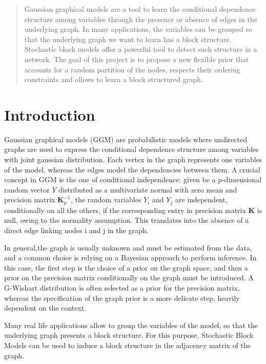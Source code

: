 


\begin{abstract} %
Gaussian graphical models are a tool to learn the conditional dependence structure among variables through the presence or absence of edges in the underlying graph. In many applications, the variables can be grouped so that the underlying graph we want to learn has a block structure. Stochastic block models offer a powerful tool to detect such structure in a network. The goal of this project is to propose a new flexible prior that accounts for a random partition of the nodes, respects their ordering constraints and allows to learn a block structured graph.
\end{abstract}


\section{Introduction}

Gaussian graphical models (GGM) are probabilistic models where undirected graphs are used to express the conditional dependence structure among variables with joint gaussian distribution. Each vertex in the graph represents one variables of the model, whereas the edges model the dependencies between them. A crucial concept in GGM is the one of conditional independence: given be a p-dimensional random vector $Y$ distributed as a multivariate normal with zero mean and precision matrix $\mathbf{K}_{p}^{-1}$, the random variables $Y_i$ and $Y_j$ are independent, conditionally on all the others, if the corresponding entry in precision matrix $\mathbf{K}$ is null, owing to the normality assumption. This translates into the absence of a direct edge linking nodes i and j in the graph. 

In general,the graph is usually unknown and must be estimated from the data, and a common choice is relying on a Bayesian approach to perform inference. In this case, the first step is the choice of a prior on the graph space, and then a prior on the precision matrix conditionally on the graph must be introduced. A G-Wishart distribution is often selected as a prior for the precision matrix, whereas the specification of the graph prior is a more delicate step, heavily dependent on the context.

Many real life applications allow to group the variables of the model, so that the underlying graph presents a block structure. For this purpose, Stochastic Block Models can be used to induce a block structure in the adjacency matrix of the graph. 

